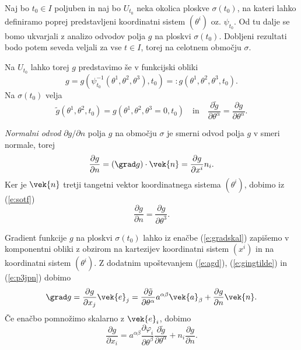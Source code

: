 Naj bo $t_0\in I$ poljuben in naj bo $U_{t_0}$ neka okolica ploskve $\sigma(t_0)$,
na kateri lahko definiramo poprej predstavljeni koordinatni sistem $(\theta^i)$ oz. $\psi_{t_0}$.
Od tu dalje se bomo ukvarjali z analizo odvodov polja $g$ na ploskvi $\sigma(t_0)$.
Dobljeni rezultati bodo potem seveda veljali za vse $t\in I$, torej na celotnem
območju $\sigma$.

Na $U_{t_0}$ lahko torej $g$ predstavimo še v funkcijski obliki
\[ g=g(\psi_{t_0}^{-1}(\theta^1,\theta^2,\theta^3),t_0)=:g(\theta^1,\theta^2,\theta^3,t_0). \]
Na $\sigma(t_0)$ velja
\begin{equation} \label{e:gingtilde}
	\tilde{g}(\theta^1,\theta^2,t_0)=g(\theta^1,\theta^2,\theta^3=0,t_0) \quad\textrm{in}\quad
	\frac{\partial \tilde{g}}{\partial\theta^{\alpha}}=\frac{\partial g}{\partial\theta^{\alpha}}.
\end{equation}

\emph{Normalni odvod} $\partial g/\partial n$ polja $g$ na območju $\sigma$
je smerni odvod polja $g$ v smeri normale, torej
\begin{equation} \label{e:nodovkat}
	\frac{\partial g}{\partial n}=(\grad g)\cdot\vek{n}=\frac{\partial g}{\partial x^i}n_i.
\end{equation}
Ker je $\vek{n}$ tretji tangetni vektor koordinatnega sistema $(\theta^i)$,
dobimo iz (\ref{e:sotf})
\begin{equation} \label{e:p3jpn}
	\frac{\partial g}{\partial n}=\frac{\partial g}{\partial \theta^3}.
\end{equation}

Gradient funkcije $g$ na ploskvi $\sigma(t_0)$ lahko iz enačbe
(\ref{e:gradskal}) zapišemo v komponentni obliki z obzirom na kartezijev koordinatni
sistem $(x^i)$ in na koordinatni sistem $(\theta^i)$. Z dodatnim upoštevanjem 
(\ref{e:agd}), (\ref{e:gingtilde}) in (\ref{e:p3jpn}) dobimo
\begin{equation} \label{e:ojej}
 \grad g = \frac{\partial g}{\partial x_j}\vek{e}_j
 =\frac{\partial \tilde{g}}{\partial\theta^{\alpha}}a^{\alpha\beta}\vek{a}_{\beta}+
 \frac{\partial g}{\partial n}\vek{n}.
\end{equation}
Če enačbo pomnožimo skalarno z $\vek{e}_i$, dobimo
\begin{equation} \label{e:kpspace}
 \frac{\partial g}{\partial x_i}=
 a^{\alpha\beta}\frac{\partial\varphi_i}{\partial\theta^{\beta}}
 \frac{\partial \tilde{g}}{\partial\theta^{\alpha}}+
 n_i\frac{\partial g}{\partial n}.
\end{equation}

